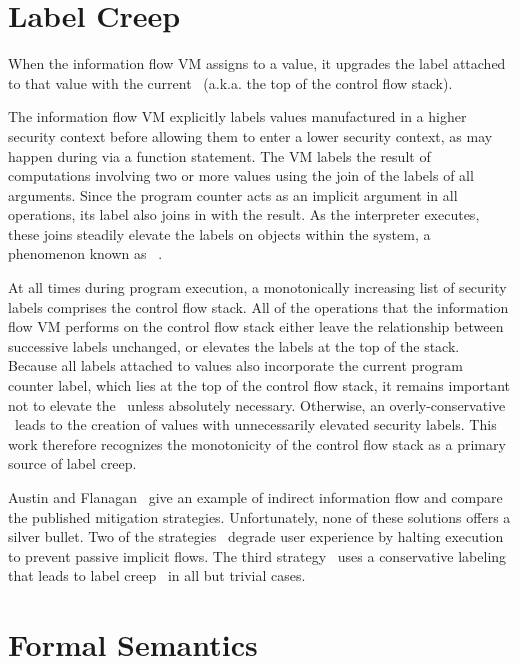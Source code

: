 \section{Label Creep}\label{sec:label-creep}
When the information flow VM assigns to a value, it upgrades the label attached to that value with the current \pclabel\ (a.k.a. the top of the control flow stack).

The information flow VM explicitly labels values manufactured in a higher security context before allowing them to enter a lower security context, as may happen during via a function  statement.
The VM labels the result of computations involving two or more values using the join of the labels of all arguments.
Since the program counter acts as an implicit argument in all operations, its label also joins in with the result.
As the interpreter executes, these joins steadily elevate the labels on objects within the system, a phenomenon known as ~\cite{sabelfeld.myers+03}.

At all times during program execution, a monotonically increasing list of security labels comprises the control flow stack.
All of the operations that the information flow VM performs on the control flow stack either leave the relationship between successive labels unchanged, or elevates the labels at the top of the stack.
Because all labels attached to values also incorporate the current program counter label, which lies at the top of the control flow stack, it remains important not to elevate the \pclabel\ unless absolutely necessary.
Otherwise, an overly-conservative \pclabel\ leads to the creation of values with unnecessarily elevated security labels.
This work therefore recognizes the monotonicity of the control flow stack as a primary source of label creep.

Austin and Flanagan~\cite{austin.flanagan+12} give an example of indirect information flow and compare the published mitigation strategies.
Unfortunately, none of these solutions offers a silver bullet.
Two of the strategies~\cite{zdancewic+02,austin.flanagan+10} degrade user experience by halting execution to prevent passive implicit flows.
The third strategy~\cite{vogt.etal+07} uses a conservative labeling that leads to label creep~\cite{sabelfeld.myers+03} in all but trivial cases.

\section{Formal Semantics}\label{sec:formal-semantics}

